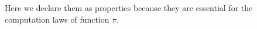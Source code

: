 \begin{code}
\\
\>[0]\<[13]%
\>[13] \AgdaSymbol{(} \AgdaSymbol{:}  \AgdaSymbol{)}    \AgdaSymbol{(}  \AgdaSymbol{)} \<[52]%
\>[52]\<%
\\
\>[13]\<[15]%
\>[15]\AgdaSymbol{(}     \AgdaSymbol{(}  \AgdaSymbol{(} \AgdaInductiveConstructor{,} \AgdaSymbol{)))} \<[56]%
\>[56]\<%
\\
\>[15]\<[17]%
\>[17] \AgdaSymbol{(}   \AgdaSymbol{)}\<%
\\
\>\<\end{code}
Here we declare them as properties because they are essential for the computation laws of function $\pi$.



